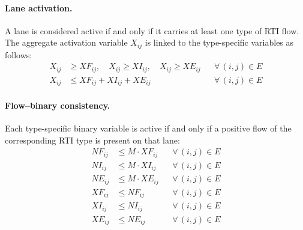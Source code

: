 \paragraph{Lane activation.}
A lane is considered active if and only if it carries at least one type of RTI
flow. The aggregate activation variable $X_{ij}$ is linked to the
type-specific variables as follows:
%
\begin{align}
  X_{ij} &\geq XF_{ij},\quad
  X_{ij} \geq XI_{ij},\quad
  X_{ij} \geq XE_{ij}
    && \forall\,(i,j) \in E
    \label{eq:lane-activation-lb} \\
  X_{ij} &\leq XF_{ij} + XI_{ij} + XE_{ij}
    && \forall\,(i,j) \in E
    \label{eq:lane-activation-ub}
\end{align}

\paragraph{Flow--binary consistency.}
Each type-specific binary variable is active if and only if a positive flow
of the corresponding RTI type is present on that lane:
%
\begin{align}
  NF_{ij} &\leq M\cdot XF_{ij}
    && \forall\,(i,j) \in E
    \label{eq:bigM-full} \\
  NI_{ij} &\leq M\cdot XI_{ij}
    && \forall\,(i,j) \in E
    \label{eq:bigM-inlay} \\
  NE_{ij} &\leq M\cdot XE_{ij}
    && \forall\,(i,j) \in E
    \label{eq:bigM-empty} \\[4pt]
  XF_{ij} &\leq NF_{ij}
    && \forall\,(i,j) \in E
    \label{eq:lb-full} \\
  XI_{ij} &\leq NI_{ij}
    && \forall\,(i,j) \in E
    \label{eq:lb-inlay} \\
  XE_{ij} &\leq NE_{ij}
    && \forall\,(i,j) \in E
    \label{eq:lb-empty}
\end{align}
